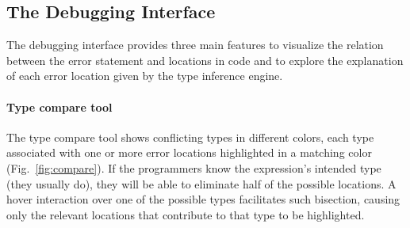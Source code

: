 

\subsection{The Debugging Interface}

The \chameleon{} debugging interface provides three main features to visualize the relation between the error statement and locations in code and to explore the explanation of each error location given by the type inference engine. %


\paragraph{Type compare tool} \label{sub:type-compare}

The type compare tool shows conflicting types in different colors, each type associated with one or more error locations highlighted in a matching color (Fig.~\ref{fig:compare}).  
If the programmers know the expression's intended type (they usually do), they will be able to eliminate half of the possible locations. 
A hover interaction over one of the possible types facilitates such bisection, causing only the relevant locations that contribute to that type to be highlighted. 


